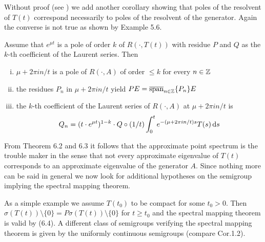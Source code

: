 Without proof (see \citet[Prop.I.10]{greiner:1981}) we add another corollary showing that poles of the resolvent of $T(t)$ correspond necessarily to poles of the resolvent of the generator.
Again the converse is not true as shown by Example 5.6.
\begin{corollary}\label{cor:a3-6.5}
Assume that $e^{\mu t}$ is a pole of order $k$ of $R(\cdot,T(t))$ with residue $P$ and $Q$ as the $k$-th coefficient of the Laurent series.
Then
\begin{enumerate}[(i)]
\item 
$\mu + 2\pi i n/t$ is a pole of $R(\cdot,A)$ of order $\leq k$ for every $n \in \mathbb{Z}$

\item 
the residues $P_{n}$ in $\mu + 2\pi i n/t$ yield $PE = \overline{\text{span}}_{n \in \mathbb{Z}} \{P_{n}\}E$

\item 
the $k$-th coefficient of the Laurent series of $R(\cdot,A)$ at $\mu + 2\pi i n/t$ is
\[
Q_{n} = (t \cdot e^{\mu t})^{1-k} \cdot Q \circ (1/t) \int_{0}^{t} e^{-(\mu+2\pi i n/t)s}T(s) \mathop{}\!\mathrm{d}{s}
\]
\end{enumerate}
\end{corollary}
From Theorem 6.2 and 6.3 it follows that the approximate point spectrum is the trouble maker in the sense that not every approximate eigenvalue of $T(t)$ corresponds to an approximate eigenvalue of the generator $A$.
Since nothing more can be said in general we now look for additional hypotheses on the semigroup implying the spectral mapping theorem.

As a simple example we assume $T(t_{0})$ to be compact for some $t_{0} > 0$.
Then $\sigma(T(t)) \setminus \{0\} = P\sigma(T(t)) \setminus \{0\}$ for $t \geq t_{0}$ and the spectral mapping theorem is valid by (6.4).
A different class of semigroups verifying the spectral mapping theorem is given by the uniformly continuous semigroups (compare Cor.1.2).

